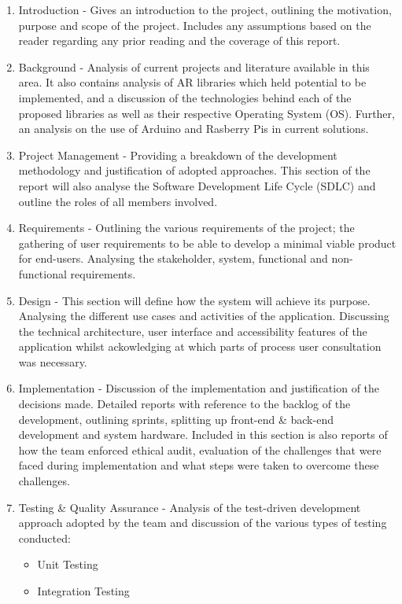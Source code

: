 \begin{enumerate}
	\item Introduction - Gives an introduction to the project, outlining the motivation, purpose and scope of the project.  Includes any assumptions based on the reader regarding any prior reading and the coverage of this report.
	\item Background - Analysis of current projects and literature available in this area. It also contains analysis of AR libraries which held potential to be implemented, and a discussion of the technologies behind each of the proposed libraries as well as their respective Operating System (OS). Further, an analysis on the use of Arduino and Rasberry Pis in current solutions.
	\item Project Management - Providing a breakdown of the development methodology and justification of adopted approaches. This section of the report will also analyse the Software Development Life Cycle (SDLC) and outline the roles of all members involved.
	\item Requirements - Outlining the various requirements of the project; the gathering of user requirements to be able to develop a minimal viable product for end-users. Analysing the stakeholder, system, functional and non-functional requirements.
	\item Design - This section will define how the system will achieve its purpose. Analysing the different use cases and activities of the application. Discussing the technical architecture, user interface and accessibility features of the application whilst ackowledging at which parts of process user consultation was necessary.
	\item Implementation - Discussion of the implementation and justification of the decisions made. Detailed reports with reference to the backlog of the development, outlining sprints, splitting up front-end \& back-end development and system hardware. Included in this section is also reports of how the team enforced ethical audit, evaluation of the challenges that were faced during implementation and what steps were taken to overcome these challenges.
	\item Testing \& Quality Assurance - Analysis of the test-driven development approach adopted by the team and discussion of the various types of testing conducted:
		\begin{itemize}
			\item Unit Testing
			\item Integration Testing

\end{itemize}
\end{enumerate}
